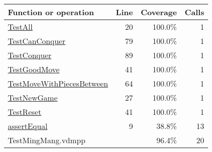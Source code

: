 \begin{longtable}{|l|r|r|r|}
\hline
Function or operation & Line & Coverage & Calls \\
\hline
\hline
\hyperref[TestAll:20]{TestAll} & 20&100.0\% & 1 \\
\hline
\hyperref[TestCanConquer:79]{TestCanConquer} & 79&100.0\% & 1 \\
\hline
\hyperref[TestConquer:89]{TestConquer} & 89&100.0\% & 1 \\
\hline
\hyperref[TestGoodMove:41]{TestGoodMove} & 41&100.0\% & 1 \\
\hline
\hyperref[TestMoveWithPiecesBetween:64]{TestMoveWithPiecesBetween} & 64&100.0\% & 1 \\
\hline
\hyperref[TestNewGame:27]{TestNewGame} & 27&100.0\% & 1 \\
\hline
\hyperref[TestReset:41]{TestReset} & 41&100.0\% & 1 \\
\hline
\hyperref[assertEqual:9]{assertEqual} & 9&38.8\% & 13 \\
\hline
\hline
TestMingMang.vdmpp & & 96.4\% & 20 \\
\hline
\end{longtable}

